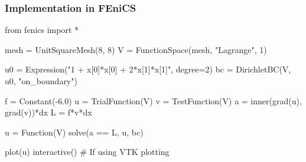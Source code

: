 \begin{frame}[fragile]
  \frametitle{Implementation in FEniCS}
  \begin{python}
from fenics import *

mesh = UnitSquareMesh(8, 8)
V = FunctionSpace(mesh, "Lagrange", 1)

u0 = Expression("1 + x[0]*x[0] + 2*x[1]*x[1]", degree=2)
bc = DirichletBC(V, u0, "on_boundary")

f = Constant(-6.0)
u = TrialFunction(V)
v = TestFunction(V)
a = inner(grad(u), grad(v))*dx
L = f*v*dx

u = Function(V)
solve(a == L, u, bc)

plot(u)
interactive() # If using VTK plotting
  \end{python}

\end{frame}
